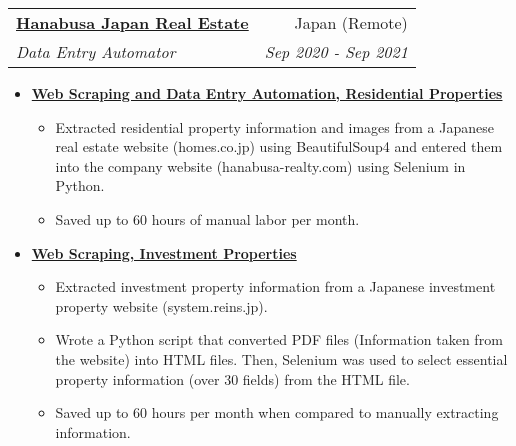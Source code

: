 \documentclass[letterpaper,11pt]{article}
\makeatletter
\newcommand{\resumeItem}[2]{
  \item\small{
    \textbf{#1}{ #2 \vspace{-5pt}}
  }
}
\newcommand{\resumeSubheading}[4]{
  \vspace{-1pt}\item
    \begin{tabular*}{0.97\textwidth}{l@{\extracolsep{\fill}}r}
      \textbf{#1} & #2 \\
      \textit{\small#3} & \textit{\small #4} \\
    \end{tabular*}\vspace{-5pt}
}
\newcommand{\resumeItemListStart}{\begin{itemize}}
\newcommand{\resumeItemListEnd}{\end{itemize}\vspace{-5pt}}
\makeatother
\begin{document}
    \resumeSubheading
      {\href{https://hanabusa-realty.com/}{Hanabusa Japan Real Estate}}{Japan (Remote)}
      {Data Entry Automator}{Sep 2020 - Sep 2021}
      \resumeItemListStart
        \resumeItem{\href{https://github.com/pl3lee/Hanabusa-Automation}{Web Scraping and Data Entry Automation, Residential Properties}}
        {\begin{itemize}
            \item Extracted residential property information and images from a Japanese real estate website (homes.co.jp) using BeautifulSoup4 and entered them into the company website (hanabusa-realty.com) using Selenium in Python.
            \item Saved up to 60 hours of manual labor per month.
        \end{itemize}}
        \resumeItem{\href{https://github.com/pl3lee/Reins-Automation}{Web Scraping, Investment Properties}}
        {\begin{itemize}
            \item Extracted investment property information from a Japanese investment property website (system.reins.jp).
            \item Wrote a Python script that converted PDF files (Information taken from the website) into HTML files. Then, Selenium was used to select essential property information (over 30 fields) from the HTML file.
            \item Saved up to 60 hours per month when compared to manually extracting information.
        \end{itemize}}
      \resumeItemListEnd

\end{document}
